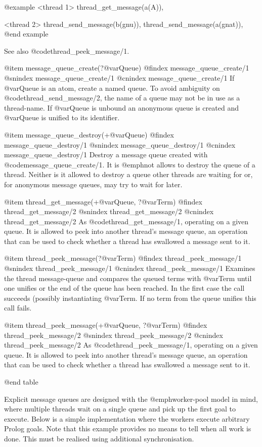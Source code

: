 @example
   <thread 1>
   thread_get_message(a(A)),

   <thread 2>
   thread_send_message(b(gnu)),
   thread_send_message(a(gnat)),
@end example

See also @code{thread_peek_message/1}.

@item message_queue_create(?@var{Queue})
@findex message_queue_create/1
@snindex message_queue_create/1
@cnindex message_queue_create/1
If @var{Queue} is an atom, create a named queue.  To avoid ambiguity
on @code{thread_send_message/2}, the name of a queue may not be in use
as a thread-name.  If @var{Queue} is unbound an anonymous queue is
created and @var{Queue} is unified to its identifier.

@item message_queue_destroy(+@var{Queue})
@findex message_queue_destroy/1
@snindex message_queue_destroy/1
@cnindex message_queue_destroy/1
Destroy a message queue created with @code{message_queue_create/1}.  It is
@emph{not} allows to destroy the queue of a thread.  Neither is it
allowed to destroy a queue other threads are waiting for or, for
anonymous message queues, may try to wait for later.

@item thread_get_message(+@var{Queue}, ?@var{Term})
@findex thread_get_message/2
@snindex thread_get_message/2
@cnindex thread_get_message/2
As @code{thread_get_message/1}, operating on a given queue. It is allowed to
peek into another thread's message queue, an operation that can be used
to check whether a thread has swallowed a message sent to it.

@item thread_peek_message(?@var{Term})
@findex thread_peek_message/1
@snindex thread_peek_message/1
@cnindex thread_peek_message/1
Examines the thread message-queue and compares the queued terms
with @var{Term} until one unifies or the end of the queue has been
reached.  In the first case the call succeeds (possibly instantiating
@var{Term}.  If no term from the queue unifies this call fails.

@item thread_peek_message(+@var{Queue}, ?@var{Term})
@findex thread_peek_message/2
@snindex thread_peek_message/2
@cnindex thread_peek_message/2
As @code{thread_peek_message/1}, operating on a given queue. It is allowed to
peek into another thread's message queue, an operation that can be used
to check whether a thread has swallowed a message sent to it.

@end table


Explicit message queues are designed with the @emph{worker-pool} model
in mind, where multiple threads wait on a single queue and pick up the
first goal to execute.  Below is a simple implementation where the
workers execute arbitrary Prolog goals.  Note that this example provides
no means to tell when all work is done. This must be realised using
additional synchronisation.

